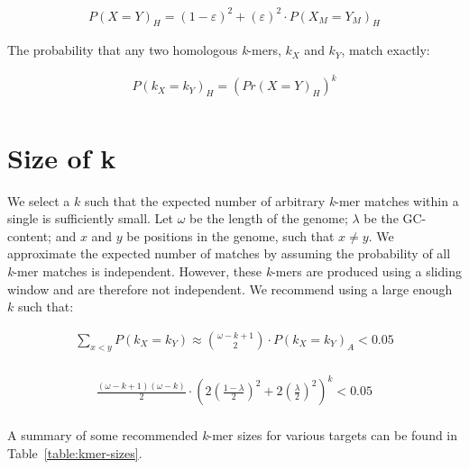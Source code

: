 \documentclass{article}
\begin{document}
\begin{equation}
\begin{split}
  P(X = Y)_{H} = (1 - \varepsilon)^2 + (\varepsilon)^2 \cdot P(X_{M} = Y_{M})_{H}
\end{split}
\end{equation}
  
The probability that any two homologous \textit{k}-mers, \(k_X\) and \(k_Y\), match exactly:
  
\begin{equation}
\begin{split}  
  P(k_X = k_Y)_{H} =  (Pr(X = Y)_{H})^k\\
\end{split}
\end{equation}

\section{Size of k}
  
We select a \(k\) such that the expected number of arbitrary \textit{k}-mer matches within a single is sufficiently small. Let \(\omega\) be the length of the genome; \(\lambda\) be the GC-content; and \(x\) and \(y\) be positions in the genome, such that \(x \neq y\). We approximate the expected number of matches by assuming the probability of all \textit{k}-mer matches is independent. However, these \textit{k}-mers are produced using a sliding window and are therefore not independent. We recommend using a large enough \(k\) such that:

\begin{equation}
\begin{split}  
  \sum_{x < y} P(k_X = k_Y) \approx \binom{\omega - k + 1}{2} \cdot P(k_X = k_Y)_{A} < 0.05 \\
\end{split}
\end{equation}

\begin{equation}
\begin{split}  
  \frac{(\omega - k + 1)(\omega - k)}{2} \cdot \left(2 \left(\frac{1 - \lambda}{2}\right)^2 + 2 \left(\frac{\lambda}{2}\right)^2 \right)^k < 0.05 \\
\end{split}
\end{equation}
  
A summary of some recommended \textit{k}-mer sizes for various targets can be found in Table~\ref{table:kmer-sizes}.
\end{document}
